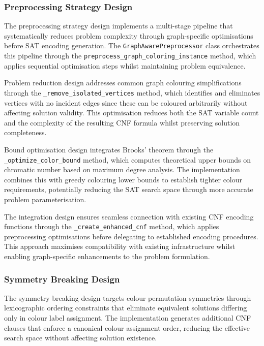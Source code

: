 \subsubsection{Preprocessing Strategy Design}

The preprocessing strategy design implements a multi-stage pipeline that systematically reduces problem complexity through graph-specific optimisations before SAT encoding generation. The \texttt{Graph\-Aware\-Preprocessor} class orchestrates this pipeline through the \texttt{preprocess\_graph\_coloring\_\-instance} method, which applies sequential optimisation steps whilst maintaining problem equivalence.

Problem reduction design addresses common graph colouring simplifications through the \texttt{\_remove\_isolated\_vertices} method, which identifies and eliminates vertices with no incident edges since these can be coloured arbitrarily without affecting solution validity. This optimisation reduces both the SAT variable count and the complexity of the resulting CNF formula whilst preserving solution completeness.

Bound optimisation design integrates Brooks' theorem through the \texttt{\_optimize\_\-color\_bound} method, which computes theoretical upper bounds on chromatic number based on maximum degree analysis. The implementation combines this with greedy colouring lower bounds to establish tighter colour requirements, potentially reducing the SAT search space through more accurate problem parameterisation.

The integration design ensures seamless connection with existing CNF encoding functions through the \texttt{\_create\_enhanced\_cnf} method, which applies preprocessing optimisations before delegating to established encoding procedures. This approach maximises compatibility with existing infrastructure whilst enabling graph-specific enhancements to the problem formulation.

\subsubsection{Symmetry Breaking Design}

The symmetry breaking design targets colour permutation symmetries through lexicographic ordering constraints that eliminate equivalent solutions differing only in colour label assignment. The implementation generates additional CNF clauses that enforce a canonical colour assignment order, reducing the effective search space without affecting solution existence.

